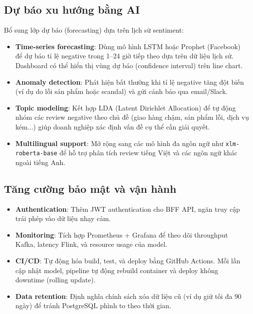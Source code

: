 \subsection{Dự báo xu hướng bằng AI}

Bổ sung lớp dự báo (forecasting) dựa trên lịch sử sentiment:

\begin{itemize}
    \item \textbf{Time-series forecasting}: Dùng mô hình LSTM hoặc Prophet (Facebook) để dự báo tỉ lệ negative trong 1--24 giờ tiếp theo dựa trên dữ liệu lịch sử. Dashboard có thể hiển thị vùng dự báo (confidence interval) trên line chart.
    \item \textbf{Anomaly detection}: Phát hiện bất thường khi tỉ lệ negative tăng đột biến (ví dụ do lỗi sản phẩm hoặc scandal) và gửi cảnh báo qua email/Slack.
    \item \textbf{Topic modeling}: Kết hợp LDA (Latent Dirichlet Allocation) để tự động nhóm các review negative theo chủ đề (giao hàng chậm, sản phẩm lỗi, dịch vụ kém...) giúp doanh nghiệp xác định vấn đề cụ thể cần giải quyết.
    \item \textbf{Multilingual support}: Mở rộng sang các mô hình đa ngôn ngữ như \texttt{xlm-roberta-base} để hỗ trợ phân tích review tiếng Việt và các ngôn ngữ khác ngoài tiếng Anh.
\end{itemize}

\subsection{Tăng cường bảo mật và vận hành}

\begin{itemize}
    \item \textbf{Authentication}: Thêm JWT authentication cho BFF API, ngăn truy cập trái phép vào dữ liệu nhạy cảm.
    \item \textbf{Monitoring}: Tích hợp Prometheus + Grafana để theo dõi throughput Kafka, latency Flink, và resource usage của model.
    \item \textbf{CI/CD}: Tự động hóa build, test, và deploy bằng GitHub Actions. Mỗi lần cập nhật model, pipeline tự động rebuild container và deploy không downtime (rolling update).
    \item \textbf{Data retention}: Định nghĩa chính sách xóa dữ liệu cũ (ví dụ giữ tối đa 90 ngày) để tránh PostgreSQL phình to theo thời gian.
\end{itemize}
